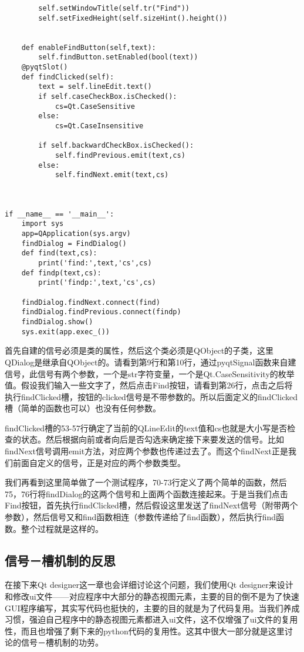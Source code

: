 \documentclass[11pt,oneside]{article}
\begin{document}
\begin{verbatim}
        self.setWindowTitle(self.tr("Find"))
        self.setFixedHeight(self.sizeHint().height())


    def enableFindButton(self,text):
        self.findButton.setEnabled(bool(text))
    @pyqtSlot()
    def findClicked(self):
        text = self.lineEdit.text()
        if self.caseCheckBox.isChecked():
            cs=Qt.CaseSensitive
        else:
            cs=Qt.CaseInsensitive

        if self.backwardCheckBox.isChecked():
            self.findPrevious.emit(text,cs)
        else:
            self.findNext.emit(text,cs)



if __name__ == '__main__':
    import sys
    app=QApplication(sys.argv)
    findDialog = FindDialog()
    def find(text,cs):
        print('find:',text,'cs',cs)
    def findp(text,cs):
        print('findp:',text,'cs',cs)

    findDialog.findNext.connect(find)
    findDialog.findPrevious.connect(findp)
    findDialog.show()
    sys.exit(app.exec_())
\end{verbatim}

首先自建的信号必须是类的属性，然后这个类必须是QObject的子类，这里QDialog是继承自QObject的。请看到第9行和第10行，通过pyqtSignal函数来自建信号，此信号有两个参数，一个是str字符变量，一个是Qt.CaseSensitivity的枚举值。假设我们输入一些文字了，然后点击Find按钮，请看到第26行，点击之后将执行findClicked槽，按钮的clicked信号是不带参数的。所以后面定义的findClicked槽（简单的函数也可以）也没有任何参数。

findClicked槽的53-57行确定了当前的QLineEdit的text值和cs也就是大小写是否检查的状态。然后根据向前或者向后是否勾选来确定接下来要发送的信号。比如findNext信号调用emit方法，对应两个参数也传递过去了。而这个findNext正是我们前面自定义的信号，正是对应的两个参数类型。

我们再看到这里简单做了一个测试程序，70-73行定义了两个简单的函数，然后75，76行将findDialog的这两个信号和上面两个函数连接起来。于是当我们点击Find按钮，首先执行findClicked槽，然后假设这里发送了findNext信号（附带两个参数），然后信号又和find函数相连（参数传递给了find函数），然后执行find函数。整个过程就是这样的。


\subsection{信号－槽机制的反思}
\label{sec:orgheadline21}
在接下来Qt designer这一章也会详细讨论这个问题，我们使用Qt designer来设计和修改ui文件——对应程序中大部分的静态视图元素，主要的目的倒不是为了快速GUI程序编写，其实写代码也挺快的，主要的目的就是为了代码复用。当我们养成习惯，强迫自己程序中的静态视图元素都进入ui文件，这不仅增强了ui文件的复用性，而且也增强了剩下来的python代码的复用性。这其中很大一部分就是这里讨论的信号－槽机制的功劳。
\end{document}
